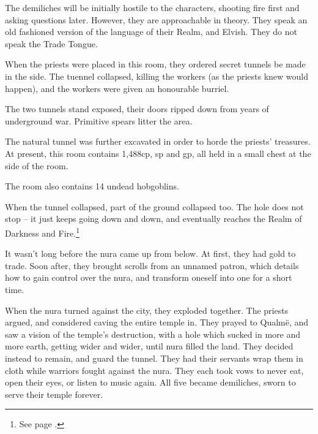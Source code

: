 \begin{multicols}{2}
The demiliches will be initially hostile to the characters, shooting fire first and asking questions later.  However, they are approachable in theory.  They speak an old fashioned version of the language of their Realm, and Elvish.  They do not speak the Trade Tongue.


\begin{boxtext}
When the priests were placed in this room, they ordered secret tunnels be made in the side.  The tuennel collapsed, killing the workers (as the priests knew would happen), and the workers were given an honourable burriel.
\end{boxtext}

The two tunnels stand exposed, their doors ripped down from years of underground war.  Primitive spears litter the area.


The natural tunnel was further excavated in order to horde the priests' treasures.  At present, this room contains 1,488cp, \thepage sp and  gp, all held in a small chest at the side of the room.

The room also contains 14 undead hobgoblins.


\ghoulhobgoblin


\begin{boxtext}
When the tunnel collapsed, part of the ground collapsed too.  The hole does not stop -- it just keeps going down and down, and eventually reaches the Realm of Darkness and Fire.\footnote{See page \pageref{darknessandfire}.}

It wasn't long before the nura came up from below.  At first, they had gold to trade.  Soon after, they brought scrolls from an unnamed patron, which details how to gain control over the nura, and transform oneself into one for a short time.

When the nura turned against the city, they exploded together.  The priests argued, and considered caving the entire temple in.  They prayed to Qualm\"{e}, and saw a vision of the temple's destruction, with a hole which sucked in more and more earth, getting wider and wider, until nura filled the land.  They decided instead to remain, and guard the tunnel.  They had their servants wrap them in cloth while warriors fought against the nura.  They each took vows to never eat, open their eyes, or listen to music again.  All five became demiliches, sworn to serve their temple forever.


\end{boxtext}
\end{multicols}
